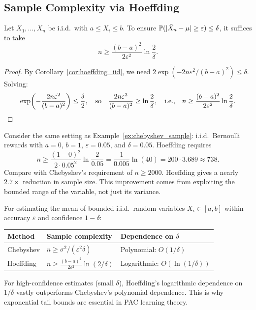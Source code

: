 \documentclass[11pt,a4paper]{article}
\begin{document}
\subsection{Sample Complexity via Hoeffding}

\begin{proposition}
\label{prop:hoeffding_sample}
Let $X_1, \ldots, X_n$ be i.i.d.\ with $a \leq X_i \leq b$. To
ensure $\mathbb{P}(|\bar{X}_n - \mu| \geq \varepsilon) \leq \delta$,
it suffices to take
\[
    n \geq \frac{(b-a)^2}{2\varepsilon^2} \ln\frac{2}{\delta}.
\]
\end{proposition}

\begin{proof}
By Corollary~\ref{cor:hoeffding_iid}, we need
$2\exp(-2n\varepsilon^2/(b-a)^2) \leq \delta$. Solving:
\[
    \exp\!\left(-\frac{2n\varepsilon^2}{(b-a)^2}\right)
    \leq \frac{\delta}{2},
    \quad\text{so}\quad
    \frac{2n\varepsilon^2}{(b-a)^2} \geq \ln\frac{2}{\delta},
    \quad\text{i.e.,}\quad
    n \geq \frac{(b-a)^2}{2\varepsilon^2}\ln\frac{2}{\delta}. \qedhere
\]
\end{proof}

\begin{example}
\label{ex:hoeffding_vs_chebyshev}
Consider the same setting as Example~\ref{ex:chebyshev_sample}:
i.i.d.\ Bernoulli rewards with $a = 0$, $b = 1$,
$\varepsilon = 0.05$, and $\delta = 0.05$. Hoeffding requires
\[
    n \geq \frac{(1-0)^2}{2 \cdot 0.05^2}\ln\frac{2}{0.05}
    = \frac{1}{0.005} \ln(40)
    = 200 \cdot 3.689 \approx 738.
\]
Compare with Chebyshev's requirement of $n \geq 2000$. Hoeffding
gives a nearly $2.7\times$ reduction in sample size. This
improvement comes from exploiting the bounded range of the variable,
not just its variance.
\end{example}

\begin{keyresult}[title={Sample Complexity: Chebyshev vs.\ Hoeffding}]
For estimating the mean of bounded i.i.d.\ random variables
$X_i \in [a, b]$ within accuracy $\varepsilon$ and confidence
$1 - \delta$:
\begin{center}
\begin{tabular}{lll}
\toprule
\textbf{Method} & \textbf{Sample complexity} & \textbf{Dependence on $\delta$} \\
\midrule
Chebyshev & $n \geq \sigma^2 / (\varepsilon^2 \delta)$
    & Polynomial: $O(1/\delta)$ \\
Hoeffding & $n \geq \frac{(b-a)^2}{2\varepsilon^2}\ln(2/\delta)$
    & Logarithmic: $O(\ln(1/\delta))$ \\
\bottomrule
\end{tabular}
\end{center}
For high-confidence estimates (small $\delta$), Hoeffding's
logarithmic dependence on $1/\delta$ vastly outperforms Chebyshev's
polynomial dependence. This is why exponential tail bounds are
essential in PAC learning theory.
\end{keyresult}
\end{document}
